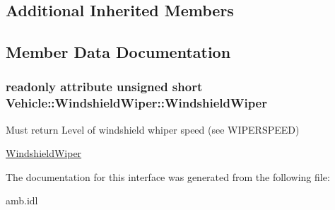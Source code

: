 \subsection*{Additional Inherited Members}


\subsection{Member Data Documentation}
\hypertarget{interfaceVehicle_1_1WindshieldWiper_a6c1c19e5f3b5c7a69e2fec50a8f280fc}{
\subsubsection[{Windshield\-Wiper}]{\setlength{\rightskip}{0pt plus 5cm}readonly attribute unsigned short Vehicle\-::\-Windshield\-Wiper\-::\-Windshield\-Wiper}}\label{interfaceVehicle_1_1WindshieldWiper_a6c1c19e5f3b5c7a69e2fec50a8f280fc}


Must return Level of windshield whiper speed (see W\-I\-P\-E\-R\-S\-P\-E\-E\-D) 

\hyperlink{interfaceVehicle_1_1WindshieldWiper}{Windshield\-Wiper} 

The documentation for this interface was generated from the following file\-:\begin{DoxyCompactItemize}
\item 
amb.\-idl\end{DoxyCompactItemize}
